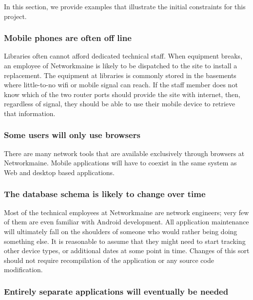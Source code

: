 In this section, we provide examples that illustrate the initial constraints
 for this project.

\subsubsection{Mobile phones are often off line}  \label{sec:offline}

Libraries often cannot afford dedicated technical staff. When equipment breaks,
an employee of Networkmaine is likely to be dispatched to the site to install a
replacement. The equipment at libraries is commonly stored in the basements
where little-to-no wifi or mobile signal can reach. If the staff member does not
know which of the two router ports should provide the site with internet, then,
regardless of signal, they should be able to use their mobile device to retrieve
that information.



\subsubsection{Some users will only use browsers}  \label{sec:browser}

There are many network tools that are available exclusively through browsers at
Networkmaine. Mobile applications will have to coexist in the same system as Web
and desktop based applications.


\subsubsection{The database schema is likely to change over time}
\label{sec:change}

Most of the technical employees at Networkmaine are network engineers; very few
of them are even familiar with Android development. All application maintenance
will ultimately fall on the shoulders of someone who would rather being doing
something else. It is reasonable to assume that they might need to start
tracking other device types, or additional dates at some point in time. Changes
of this sort should not require recompilation of the application or any source
code modification.


\subsubsection{Entirely separate applications will eventually be needed}
\label{sec:deployable}

